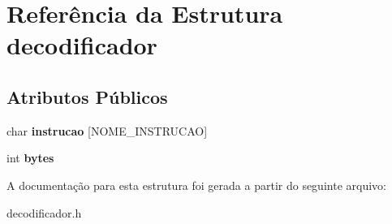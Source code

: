 \hypertarget{structdecodificador}{\section{Referência da Estrutura decodificador}
\label{structdecodificador}
}
\subsection*{Atributos Públicos}
\begin{DoxyCompactItemize}
\item 
\hypertarget{structdecodificador_a5f32df8be990bd271028f08637236f42}{char {\bfseries instrucao} \mbox{[}N\-O\-M\-E\-\_\-\-I\-N\-S\-T\-R\-U\-C\-A\-O\mbox{]}}\label{structdecodificador_a5f32df8be990bd271028f08637236f42}

\item 
\hypertarget{structdecodificador_ac463475789c6410697e1c4ae990b93a9}{int {\bfseries bytes}}\label{structdecodificador_ac463475789c6410697e1c4ae990b93a9}

\end{DoxyCompactItemize}


A documentação para esta estrutura foi gerada a partir do seguinte arquivo\-:\begin{DoxyCompactItemize}
\item 
decodificador.\-h\end{DoxyCompactItemize}
